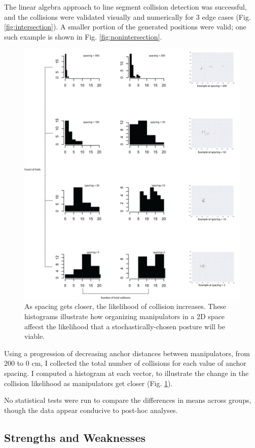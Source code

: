 \documentclass[9pt,twocolumn,twoside]{pnas-new}
\begin{document}
The linear algebra approach to line segment collision detection was successful, and the collisions were validated visually and numerically for 3 edge cases (Fig. \ref{fig:intersection}). A smaller portion of the generated positions were valid; one such example is shown in Fig. \ref{fig:nonintersection}.
\begin{figure}
\centering
\includegraphics[width=11.4cm]{collision_histograms}
\caption{As spacing gets closer, the likelihood of collision increases. These histograms illustrate how organizing manipulators in a 2D space affecst the likelihood that a stochastically-chosen posture will be viable.}\label{fig:histograms}
\end{figure}
Using a progression of decreasing anchor distances between manipulators, from 200 to 0 cm, I collected the total number of collisions for each value of anchor spacing. I computed a histogram at each vector, to illustrate the change in the collision likelihood as manipulators get closer (Fig. \ref{fig:histograms}).

No statistical tests were run to compare the differences in means across groups, though the data appear conducive to post-hoc analyses.

\subsection*{Strengths and Weaknesses}
\end{document}
